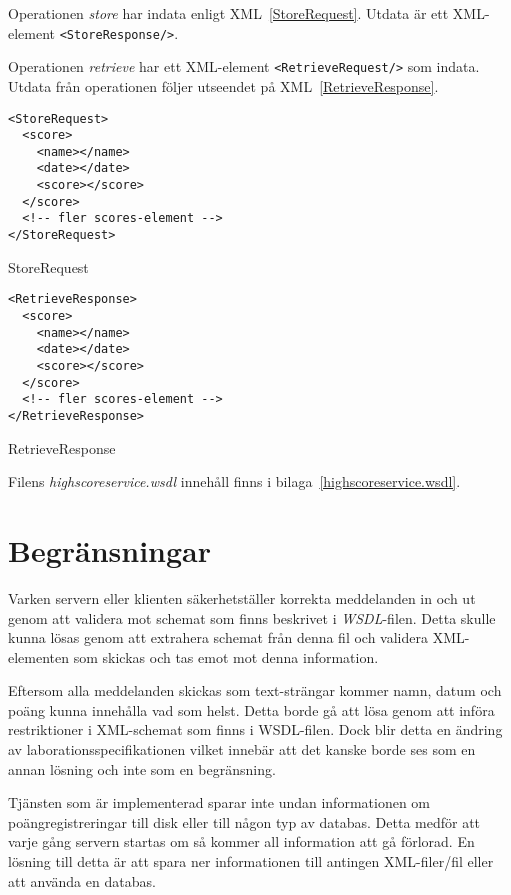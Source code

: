 \documentclass[a4paper, 12pt]{article}
\begin{document}
Operationen \textit{store} har indata enligt
XML~\ref{StoreRequest}. Utdata är ett XML-element
\verb!<StoreResponse/>!.

Operationen \textit{retrieve} har ett XML-element
\verb!<RetrieveRequest/>! som indata. Utdata från operationen följer
utseendet på XML~\ref{RetrieveResponse}.

\begin{xml}
\begin{verbatim}
<StoreRequest>
  <score>
    <name></name>
    <date></date>
    <score></score>
  </score>
  <!-- fler scores-element -->
</StoreRequest>
\end{verbatim}
  \caption{StoreRequest}\label{StoreRequest}
\end{xml}


\begin{xml}
\begin{verbatim}
<RetrieveResponse>
  <score>
    <name></name>
    <date></date>
    <score></score>
  </score>
  <!-- fler scores-element -->
</RetrieveResponse>
\end{verbatim}
  \caption{RetrieveResponse}\label{RetrieveResponse}
\end{xml}

Filens \textit{highscoreservice.wsdl} innehåll finns i
bilaga~\ref{highscoreservice.wsdl}.

\section{Begränsningar}\label{Begransningar}
Varken servern eller klienten säkerhetställer korrekta meddelanden in
och ut genom att validera mot schemat som finns beskrivet i
\textit{WSDL}-filen. Detta skulle kunna lösas genom att extrahera
schemat från denna fil och validera XML-elementen som skickas och tas
emot mot denna information.

Eftersom alla meddelanden skickas som text-strängar kommer namn, datum
och poäng kunna innehålla vad som helst. Detta borde gå att lösa genom
att införa restriktioner i XML-schemat som finns i WSDL-filen. Dock
blir detta en ändring av laborationsspecifikationen vilket innebär att
det kanske borde ses som en annan lösning och inte som en begränsning.

Tjänsten som är implementerad sparar inte undan informationen om
poäng\-registreringar till disk eller till någon typ av databas. Detta
medför att varje gång servern startas om så kommer all information att
gå förlorad. En lösning till detta är att spara ner informationen till
antingen XML-filer/fil eller att använda en databas.
\end{document}
